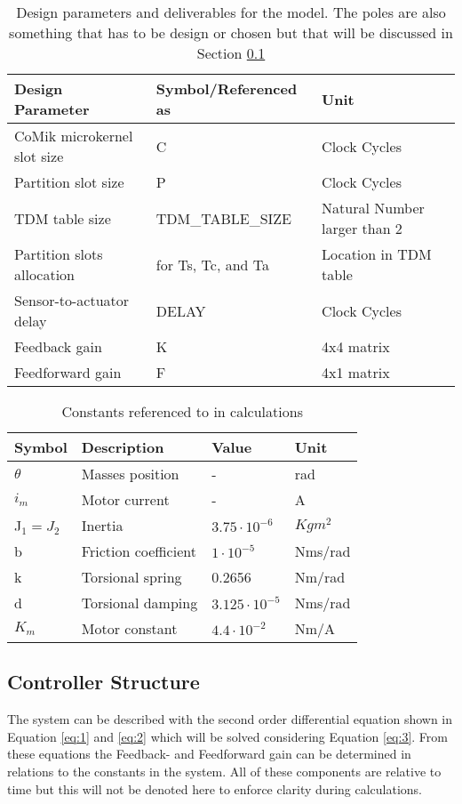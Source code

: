 \begin{table}[h!]
	\centering
	\caption{Design parameters and deliverables for the model. The poles are also something that has to be design or chosen but that will be discussed in Section \ref{sec:controllerstructure}}
	\begin{tabular}{lll}
		\toprule
		Design Parameter & Symbol/Referenced as &Unit\\
		\midrule
		CoMik microkernel slot size& C & Clock Cycles \\
		Partition slot size& P & Clock Cycles\\
		TDM table size& TDM\_TABLE\_SIZE & Natural Number larger than 2\\
		Partition slots allocation	& for Ts, Tc, and Ta & Location in TDM table \\
		Sensor-to-actuator	delay& DELAY & Clock Cycles	\\
		Feedback gain& K & 4x4 matrix \\
		Feedforward gain& F & 4x1 matrix \\
		\midrule		
	\end{tabular}
	\label{tab:design}
\end{table}

\begin{table}[htbp]
	\centering
	\caption{Constants referenced to in calculations}
	\begin{tabular}{llll}
		\toprule
		Symbol & Description & Value & Unit\\ 
		\midrule
		$\theta$ & Masses position  & -&rad \\ 
		$i_m$ & Motor current  & - &A \\ 
		J$_1 = J_2$ & Inertia  & $3.75\cdot10^{-6}$&$Kgm^2$  \\ 
		b & Friction  coefficient   &$ 1\cdot10^{-5} $&Nms/rad\\ 
		k & Torsional spring  & 0.2656 &Nm/rad\\
		d & Torsional damping  & $3.125\cdot10^{-5}$&Nms/rad \\ 
		$K_m$ & Motor constant  & $4.4\cdot10^{-2}$&Nm/A  \\ 
		\midrule
	\end{tabular}
	\label{}
\end{table}

 

\subsection{Controller Structure}
 \label{sec:controllerstructure}
The system can be described with the second order differential equation shown in Equation \ref{eq:1} and \ref{eq:2} which will be solved considering Equation \ref{eq:3}. From these equations the Feedback- and Feedforward gain can be determined in relations to the constants in the system. All of these components are relative to time but this will not be denoted here to enforce clarity during calculations.

